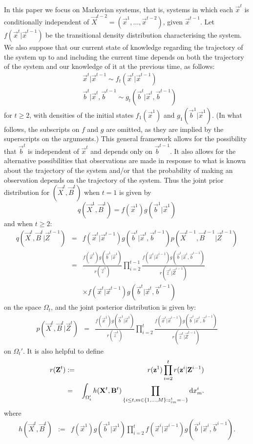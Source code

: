 In this paper we focus on Markovian systems, that is, systems in which each $\vec{x}^t$ is conditionally independent of $\vec{X}^{t-2} = (\vec{x}^1, \ldots,\vec{x}^{t-2})$, given $\vec{x}^{t-1}$. Let $f(\vec{x}^t | \vec{x}^{t-1})$ be the transitional density distribution characterising the system. We also suppose that our current state of knowledge regarding the trajectory of the system up to and including the current time depends on both the trajectory of the system and our knowledge of it at the previous time, as follows:
\begin{align*}
    &\vec{x}^t | \vec{x}^{t-1} \sim f_t(\vec{x}^t | \vec{x}^{t-1})\\
    &\vec{b}^t | \vec{x}^t, \vec{b}^{t-1} \sim g_t(\vec{b}^t | \vec{x}^t, \vec{b}^{t-1})
\end{align*}
for $t \geq 2$, with densities of the initial states $f_1(\vec{x}^1)$ and $g_1(\vec{b}^1 | \vec{x}^1)$. (In what follows, the subscripts on $f$ and $g$ are omitted, as they are implied by the superscripts on the arguments.)
This general framework allows for the possibility that $\vec{b}^t$ is independent of $\vec{x}^{t}$ and depends only on $\vec{b}^{t-1}$. It also allows for the alternative possibilities that observations are made in response to what is known about the trajectory of the system and/or that the probability of making an observation depends on the trajectory of the system. Thus the joint prior distribution for $(\vec{X}^t,\vec{B}^t)$ when $t=1$ is given by 
\[
q(\vec{X}^1,\vec{B}^1) = f(\vec{x}^1)g(\vec{b}^1 | \vec{x}^1)
\]
and when $t \geq 2$: 
\begin{eqnarray*}
    q(\vec{X}^t, \vec{B}^t | \vec{Z}^{t-1}) &=& f(\vec{x}^t | \vec{x}^{t-1}) g(\vec{b}^t | \vec{x}^t, \vec{b}^{t-1}) p(\vec{X}^{t-1}, \vec{B}^{t-1} | \vec{Z}^{t-1}) \\
& = & \frac{f(\vec{x}^1)g(\vec{b}^1 | \vec{x}^1)}{r(\vec{z}^1)} \prod_{i=2}^{t-1} \frac{f(\vec{x}^i | \vec{x}^{i-1}) g(\vec{b}^i | \vec{x}^i, \vec{b}^{i-1})}{r(\vec{z}^i | \vec{Z}^{i-1})} \\
& & \times f(\vec{x}^t | \vec{x}^{t-1}) g(\vec{b}^t | \vec{x}^t, \vec{b}^{t-1})
\end{eqnarray*}
on the space $\Omega_t$, and the joint posterior distribution is given by:
\begin{eqnarray*}
    p(\vec{X}^t, \vec{B}^t | \vec{Z}^t) 
& = & \frac{f(\vec{x}^1)g(\vec{b}^1 | \vec{x}^1)}{r(\vec{z}^1)} \prod_{i=2}^t \frac{f(\vec{x}^i | \vec{x}^{i-1}) g(\vec{b}^i | \vec{x}^i , \vec{b}^{i-1})}{r(\vec{z}^t | \vec{Z}^{t-1})} 
\end{eqnarray*}
on $\Omega_t'$. It is also helpful to define
\begin{eqnarray*}
r(\mathbf{Z}^t) & := & r(\mathbf{z}^1) \prod_{i=2}^{t} r(\mathbf{z}^i | \mathbf{Z}^{i-1}) \\
& = & \int_{\Omega_t'}  h(\mathbf{X}^t,\mathbf{B}^t) \prod_{ \{ i \leq t, m \in \{1, \ldots, M \} : z^t_{im} = - \} } \mathrm{d} x^i_m.
\end{eqnarray*}
where
\begin{eqnarray*}
h(\vec{X}^t,\vec{B}^t) & := & f(\vec{x}^1)g(\vec{b}^1 | \vec{x}^1) \prod_{i=2}^{t} f(\vec{x}^i | \vec{x}^{i-1}) g(\vec{b}^i | \vec{x}^i , \vec{b}^{i-1}).
\end{eqnarray*}

